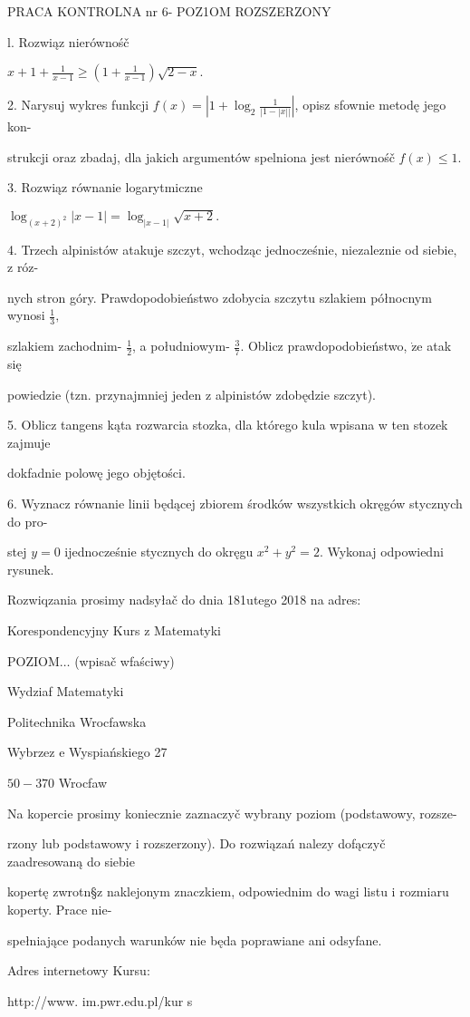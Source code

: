 \documentclass[a4paper,12pt]{article}
\begin{document}
PRACA KONTROLNA nr 6- POZ1OM ROZSZERZONY

l. Rozwiąz nierównośč

$x+1+\displaystyle \frac{1}{x-1}\geq(1+\frac{1}{x-1})\sqrt{2-x}.$

2. Narysuj wykres funkcji $f(x) = |1+ \displaystyle \log_{2}\frac{1}{|1-|x||}|$, opisz sfownie metodę jego kon-

strukcji oraz zbadaj, dla jakich argumentów spelniona jest nierównośč $f(x)\leq 1.$

3. Rozwiąz równanie logarytmiczne

$\log_{(x+2)^{2}}|x-1|=\log_{|x-1|}\sqrt{x+2}.$

4. Trzech alpinistów atakuje szczyt, wchodząc jednocześnie, niezaleznie od siebie, $\mathrm{z}$ róz-

nych stron góry. Prawdopodobieństwo zdobycia szczytu szlakiem północnym wynosi $\displaystyle \frac{1}{3},$

szlakiem zachodnim- $\displaystyle \frac{1}{2}$, a południowym- $\displaystyle \frac{3}{7}$. Oblicz prawdopodobieństwo, $\dot{\mathrm{z}}\mathrm{e}$ atak się

powiedzie (tzn. przynajmniej jeden $\mathrm{z}$ alpinistów zdobędzie szczyt).

5. Oblicz tangens kąta rozwarcia stozka, dla którego kula wpisana w ten stozek zajmuje

dokfadnie polowę jego objętości.

6. Wyznacz równanie linii będącej zbiorem środków wszystkich okręgów stycznych do pro-

stej $y=0$ ijednocześnie stycznych do okręgu $x^{2}+y^{2}=2$. Wykonaj odpowiedni rysunek.

Rozwiqzania prosimy nadsyłač do dnia 181utego 2018 na adres:

Korespondencyjny Kurs $\mathrm{z}$ Matematyki

POZIOM$\ldots$ (wpisač wfaściwy)

Wydziaf Matematyki

Politechnika Wrocfawska

Wybrzez $\mathrm{e}$ Wyspiańskiego 27

$50-370$ Wrocfaw

Na kopercie prosimy koniecznie zaznaczyč wybrany poziom (podstawowy, rozsze-

rzony lub podstawowy $\mathrm{i}$ rozszerzony). Do rozwiązań nalez$\mathrm{y}$ dofączyč zaadresowaną do siebie

kopertę zwrotn\S z naklejonym znaczkiem, odpowiednim do wagi listu $\mathrm{i}$ rozmiaru koperty. Prace nie-

spełniające podanych warunków nie będa poprawiane ani odsyfane.

Adres internetowy Kursu:

http://www. im.pwr.edu.pl/kur s
\end{document}
